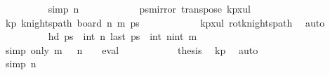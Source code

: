 \begin{isabellebody}
\isanewline
\ \ \ \ \ \ \ \ \isamarkupfalse%
\ {\isacharbrackleft}{\kern0pt}simp{\isacharbrackright}{\kern0pt}{\isacharcolon}{\kern0pt}\ {\isachardoublequoteopen}n\ {\isacharequal}{\kern0pt}\ {}{\isachardoublequoteclose}\isanewline
\ \ \ \ \ \ \ \ \isamarkupfalse%
\ {\isacharquery}{\kern0pt}ps{\isacharequal}{\kern0pt}{\isachardoublequoteopen}mirror{}\ {\isacharparenleft}{\kern0pt}transpose\ kp{}x{}ul{\isacharparenright}{\kern0pt}{\isachardoublequoteclose}\isanewline
\ \ \ \ \ \ \ \ \isamarkupfalse%
\ kp{\isacharcolon}{\kern0pt}\ {\isachardoublequoteopen}knights{\isacharunderscore}{\kern0pt}path\ {\isacharparenleft}{\kern0pt}board\ n\ m{\isacharparenright}{\kern0pt}\ {\isacharquery}{\kern0pt}ps{\isachardoublequoteclose}\isanewline
\ \ \ \ \ \ \ \ \ \ \isamarkupfalse%
\ kp{\isacharunderscore}{\kern0pt}{}x{}{\isacharunderscore}{\kern0pt}ul\ rot{}{}{\isacharunderscore}{\kern0pt}knights{\isacharunderscore}{\kern0pt}path\ \isamarkupfalse%
\ auto\isanewline
\ \ \ \ \ \ \ \ \isamarkupfalse%
\ {\isachardoublequoteopen}hd\ {\isacharquery}{\kern0pt}ps\ {\isacharequal}{\kern0pt}\ {\isacharparenleft}{\kern0pt}int\ n{\isacharcomma}{\kern0pt}{}{\isacharparenright}{\kern0pt}{\isachardoublequoteclose}\ {\isachardoublequoteopen}last\ {\isacharquery}{\kern0pt}ps\ {\isacharequal}{\kern0pt}\ {\isacharparenleft}{\kern0pt}int\ n{\isacharminus}{\kern0pt}{}{\isacharcomma}{\kern0pt}int\ m{\isacharminus}{\kern0pt}{}{\isacharparenright}{\kern0pt}{\isachardoublequoteclose}\isanewline
\ \ \ \ \ \ \ \ \ \ \isamarkupfalse%
\ {\isacharparenleft}{\kern0pt}simp\ only{\isacharcolon}{\kern0pt}\ {\isacartoucheopen}m\ {\isacharequal}{\kern0pt}\ {}{\isacartoucheclose}\ {\isacartoucheopen}n\ {\isacharequal}{\kern0pt}\ {}{\isacartoucheclose}\ {\isacharbar}{\kern0pt}\ eval{\isacharparenright}{\kern0pt}{\isacharplus}{\kern0pt}\isanewline
\ \ \ \ \ \ \ \ \isamarkupfalse%
\ \isamarkupfalse%
\ {\isacharquery}{\kern0pt}thesis\ \isamarkupfalse%
\ kp\ \isamarkupfalse%
\ auto\isanewline
\ \ \ \ \ \ \isamarkupfalse%
\isanewline
\ \ \ \ \ \ \ \ \isamarkupfalse%
\ {\isacharbrackleft}{\kern0pt}simp{\isacharbrackright}{\kern0pt}{\isacharcolon}{\kern0pt}\ {\isachardoublequoteopen}n\ {\isacharequal}{\kern0pt}\ {}{\isachardoublequoteclose}\isanewline

\end{isabellebody}
